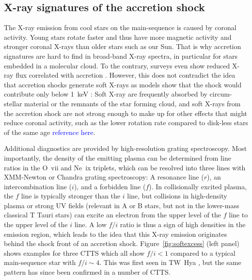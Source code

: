 \subsection{X-ray signatures of the accretion shock}
\label{sect:accretionobs}
The X-ray emission from cool stars on the main-sequence is caused by coronal activity. Young stars rotate faster and thus have more magnetic activity and stronger coronal X-rays than older stars such as our Sun. That is why accretion signatures are hard to find in broad-band X-ray spectra, in particular for stars embedded in a molecular cloud. To the contrary, surveys even show reduced X-ray flux correlated with accretion \cite{2005ApJS..160..401P}. However, this does not contradict the idea that accretion shocks generate soft X-rays as models show that the shock would contribute only below 1~keV \cite{1999AstL...25..430L}: Soft X-ray are frequently absorbed by circum-stellar material or the remnants of the star forming cloud, and soft X-rays from the accretion shock are not strong enough to make up for other effects that might reduce coronal activity, such as the lower rotation rate compared to disk-less stars of the same age \textcolor{blue}{reference here}.

Additional diagnostics are provided by high-resolution grating spectroscopy. Most importantly, the density of the emitting plasma can be determined from line ratios in the O~{\sc vii} and Ne~{\sc ix} triplets, which can be resolved into three lines with XMM-Newton or Chandra grating spectroscopy: A resonance line ($r$), an intercombination line ($i$), and a forbidden line ($f$). In collisionally excited plasma, the $f$ line is typically stronger than the $i$ line, but collisions in high-density plasma or strong UV fields (relevant in A or B stars, but not in the lower-mass classical T Tauri stars) can excite an electron from the upper level of the $f$ line to the upper level of the $i$ line. A low $f/i$ ratio is thus a sign of high densities in the emission region, which leads to the idea that this X-ray emission originates behind the shock front of an accretion shock. Figure~\ref{fig:softexcess} (left panel) shows examples for three CTTS which all show $f/i < 1$ compared to a typical main-sequence star with $f/i\sim 4$. This was first seen in TW~Hya \cite{Kastner_2002}, but the same pattern has since been confirmed in a number of CTTS.

